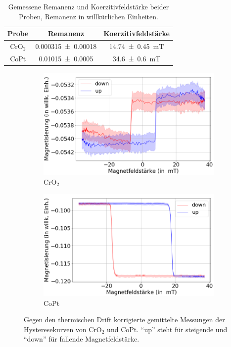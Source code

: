 	\begin{table}
		\centering
		\caption{Gemessene Remanenz und Koerzitivfeldstärke beider Proben, Remanenz in willkürlichen Einheiten.}
		\begin{tabular}{c| c | c}
			Probe & Remanenz & Koerzitivfeldstärke \\ \hline
      CrO$_2$ & \SI{0,000315+-0,00018}{} & \SI{14,74+-0,45}{mT} \\
      CoPt & \SI{0,01015+-0,0005}{}  & \SI{34,6+-0,6}{mT} \\
		\end{tabular}
		\label{tab:remko}
	\end{table}


\begin{figure}[H]
    \centering
    \begin{subfigure}{0.495\textwidth}
        \centering
        \includegraphics[width=1.1\textwidth]{plots/swp_avg_magn_man_cro}
    \caption{CrO$_2$}
    \end{subfigure}
    \begin{subfigure}{0.495\textwidth}
        \centering
        \includegraphics[width=1.1\textwidth]{plots/swp_avg_magn_man_copt}
        \caption{CoPt}
    \end{subfigure}
    \caption{Gegen den thermischen Drift korrigierte gemittelte Messungen der Hysteresekurven von CrO$_2$ und CoPt. \enquote{up} steht für steigende und \enquote{down} für fallende Magnetfeldstärke.}
    \label{fig_moke_averages}
\end{figure}
